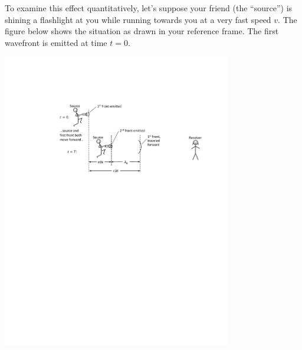 To examine this effect quantitatively, let's suppose
your friend (the ``source'') is shining a flashlight at you while running towards you at a very fast speed $v$.  The figure below shows the situation as drawn in your reference frame.  The first wavefront is emitted at time $t=0$.

\begin{center}
\includegraphics[width=0.75\textwidth]{relativistic_doppler/relativistic_front_motion.pdf}
\end{center}

